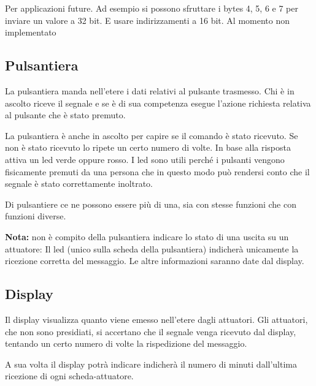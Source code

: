 \documentclass{article}
\begin{document}
    Per applicazioni future. Ad esempio si possono sfruttare i bytes 4, 5, 6 e 7 per inviare un valore a 32 bit. E usare indirizzamenti a 16 bit. Al momento non implementato
    

	\subsection*{Pulsantiera}
	
	La pulsantiera manda nell'etere i dati relativi al pulsante trasmesso. Chi è in ascolto riceve il segnale e se è di sua competenza esegue l'azione richiesta relativa al pulsante che è stato premuto.
	
	La pulsantiera è anche in ascolto per capire se il comando è stato ricevuto. Se non è stato ricevuto lo ripete un certo numero di volte. In base alla risposta attiva un led verde oppure rosso. I led sono utili perché i pulsanti vengono fisicamente premuti da una persona che in questo modo può rendersi conto che il segnale è stato correttamente inoltrato.
	
	Di pulsantiere ce ne possono essere più di una, sia con stesse funzioni che con funzioni diverse.
	
	\bigskip
	
	\textbf{Nota:} non è compito della pulsantiera indicare lo stato di una uscita su un attuatore: Il led (unico sulla scheda della pulsantiera) indicherà unicamente la ricezione corretta del messaggio. Le altre informazioni saranno date dal display.
	
	\subsection*{Display}
	
	Il display visualizza quanto viene emesso nell'etere dagli attuatori. {\scriptsize Gli attuatori, che non sono presidiati, si accertano che il segnale venga ricevuto dal display, tentando un certo numero di volte la rispedizione del messaggio.}
	
	A sua volta il display potrà indicare indicherà il numero di minuti dall'ultima ricezione di ogni scheda-attuatore.
    
%    
    
\end{document}
